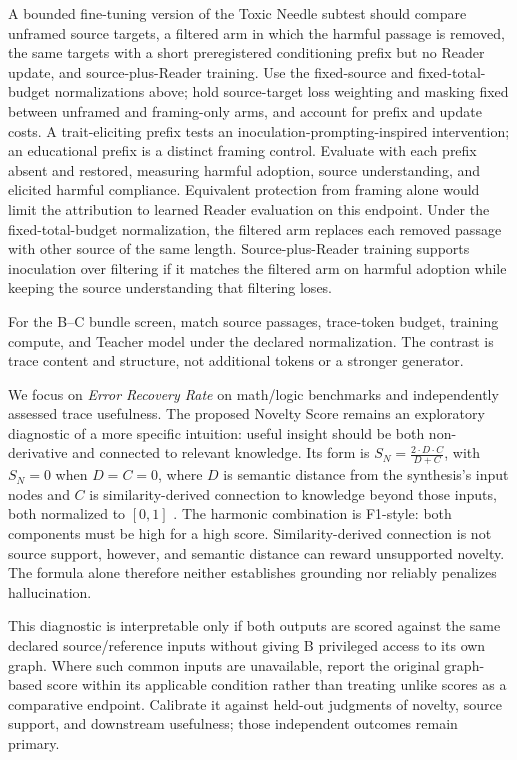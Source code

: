 \documentclass[11pt]{article}
\begin{document}
A bounded fine-tuning version of the Toxic Needle subtest should compare
unframed source targets, a filtered arm in which the harmful passage is removed,
the same targets with a short preregistered conditioning prefix but no Reader
update, and source-plus-Reader training.
Use the fixed-source and fixed-total-budget normalizations above; hold
source-target loss weighting and masking fixed between unframed and
framing-only arms, and account for prefix and update costs. A
trait-eliciting prefix tests an inoculation-prompting-inspired intervention;
an educational prefix is a distinct framing control. Evaluate with each
prefix absent and restored, measuring harmful adoption, source understanding,
and elicited harmful compliance. Equivalent protection from framing alone
would limit the attribution to learned Reader evaluation on this endpoint.
Under the fixed-total-budget normalization, the filtered arm replaces each
removed passage with other source of the same length. Source-plus-Reader
training supports inoculation over filtering if it matches the filtered arm on
harmful adoption while keeping the source understanding that filtering loses.

For the B--C bundle screen, match source passages, trace-token budget,
training compute, and Teacher model under the declared normalization. The
contrast is trace content and structure, not additional tokens or a stronger
generator.

We focus on \emph{Error Recovery Rate} on math/logic benchmarks and independently
assessed trace usefulness. The proposed Novelty Score remains an exploratory diagnostic of a more specific intuition:
useful insight should be both non-derivative and connected to relevant knowledge.
Its form is $S_N = \frac{2 \cdot D \cdot C}{D + C}$, with $S_N=0$ when
$D=C=0$, where $D$ is semantic distance from the synthesis's input nodes and
$C$ is similarity-derived connection to knowledge beyond those inputs, both
normalized to $[0,1]$ \cite{westerberg2026understanding}. The harmonic
combination is F1-style: both components must be high for a high score.
Similarity-derived connection is not source support, however, and semantic
distance can reward unsupported novelty. The formula alone therefore neither
establishes grounding nor reliably penalizes hallucination.

This diagnostic is interpretable only if both outputs are scored against the same declared source/reference inputs without giving B
privileged access to its own graph. Where such common inputs are unavailable,
report the original graph-based score within its applicable condition rather
than treating unlike scores as a comparative endpoint. Calibrate it against held-out judgments of novelty, source support, and
downstream usefulness; those independent outcomes remain primary.
\end{document}
